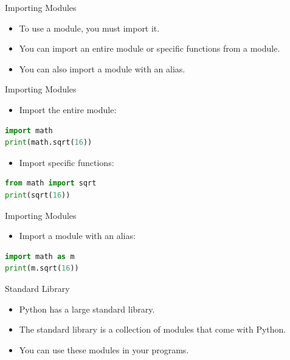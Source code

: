 \begin{frame}{Importing Modules}
    \begin{itemize}
        \item To use a module, you must import it.
        \item You can import an entire module or specific functions from a module.
        \item You can also import a module with an alias.
    \end{itemize}
\end{frame} 


\begin{frame}[fragile]{Importing Modules}
    \begin{itemize}
        \item Import the entire module:
    \end{itemize}

    \begin{lstlisting}[style=colorful, language=Python]
import math
print(math.sqrt(16))
    \end{lstlisting}

    \begin{itemize}
        \item Import specific functions:
    \end{itemize}

    \begin{lstlisting}[style=colorful, language=Python]
from math import sqrt
print(sqrt(16))
    \end{lstlisting}
\end{frame}     


\begin{frame}[fragile]{Importing Modules}
    \begin{itemize}
        \item Import a module with an alias:
    \end{itemize}

    \begin{lstlisting}[style=colorful, language=Python]
import math as m        
print(m.sqrt(16))
    \end{lstlisting}
\end{frame}

\begin{frame}{Standard Library}
    \begin{itemize}
        \item Python has a large standard library.
        \item The standard library is a collection of modules that come with Python.
        \item You can use these modules in your programs.
    \end{itemize}
\end{frame}

